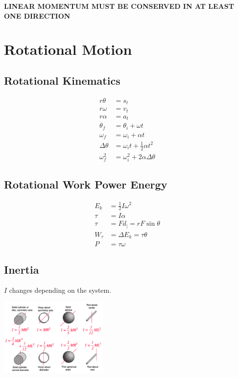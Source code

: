 \documentclass[letterpaper,10pt]{article}
\begin{document}
\begin{multicols}{2}
\medskip
\begin{center}
    \textbf{LINEAR MOMENTUM MUST BE CONSERVED IN AT LEAST ONE DIRECTION}
\end{center}

\section{Rotational Motion}
\subsection{Rotational Kinematics}
\begin{align*}
    r \theta &= s_t \\
    r \omega &= v_t \\
    r \alpha &= a_t \\
    \theta_f &= \theta_i + \omega t \\
    \omega_f &= \omega_i + \alpha t \\
    \Delta \theta &= \omega_i t + \tfrac{1}{2} \alpha t^2 \\
    \omega_f^2 &= \omega_i^2 + 2 \alpha \Delta \theta
\end{align*}

\subsection{Rotational Work Power Energy}
\begin{align*}
    E_k &= \tfrac{1}{2} I \omega^2 \\
    \tau &= I \alpha \\
    \tau &= F d_| = r F \sin \theta \\
    W_\tau &= \Delta E_k = \tau \theta \\
    P &= \tau \omega
\end{align*}

\subsection{Inertia}
$I$ changes depending on the system.

\begin{center}
    \includegraphics[width=0.4\textwidth]{moment-of-inertia.png}
\end{center}


\end{multicols}
\end{document}

